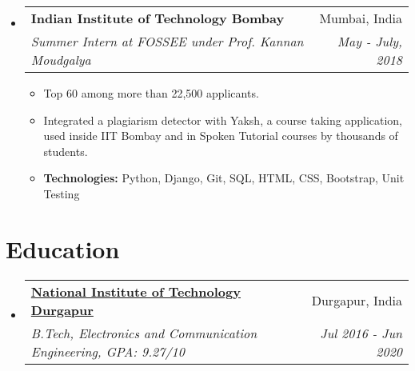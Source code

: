 \documentclass[a4paper,11pt]{article}
\makeatletter
\newcommand{\resumeSubheading}[4]{
  \vspace{-1pt}\item
    \begin{tabular*}{0.97\textwidth}[t]{l@{\extracolsep{\fill}}r}
      \textbf{#1 } & #2 \\
      \textit{\small#3} & \textit{\small #4} \\
    \end{tabular*}\vspace{-5pt}
}
\newcommand{\resumeSubHeadingListStart}{\begin{itemize}[leftmargin=*, topsep=0pt]}
\newcommand{\resumeSubHeadingListEnd}{\end{itemize}}
\newcommand{\resumeItemListStart}{\begin{itemize}}
\newcommand{\resumeItemListEnd}{\end{itemize}\vspace{-5pt}}
\makeatother
\begin{document}
    
    
  \resumeSubHeadingListStart
    \resumeSubheading
    {Indian Institute of Technology Bombay}{Mumbai, India}
    {Summer Intern at FOSSEE under Prof. Kannan Moudgalya}{May - July, 2018}
    \resumeItemListStart
      \item\small
        {Top 60 among more than 22,500 applicants.}
      \item\small
        {Integrated a plagiarism detector with Yaksh, a course taking application, used inside IIT Bombay and in Spoken Tutorial courses by thousands of students.}
      \item\small
      {\textbf{Technologies:} Python, Django, Git, SQL, HTML, CSS, Bootstrap, Unit Testing}
    \resumeItemListEnd
  \resumeSubHeadingListEnd

\section{Education}
  \resumeSubHeadingListStart
  \resumeSubheading
      {\href{https://nitdgp.ac.in}{National Institute of Technology Durgapur}}{Durgapur, India}
      {B.Tech, Electronics and Communication Engineering, GPA: 9.27/10}{Jul 2016 - Jun 2020}
  \resumeSubHeadingListEnd
\end{document}

